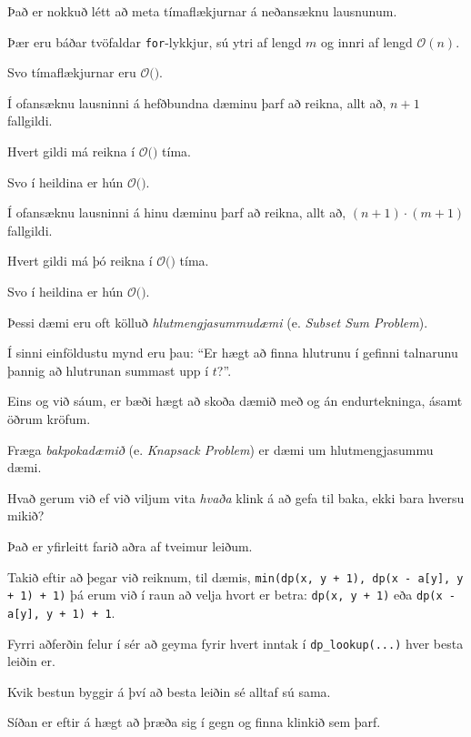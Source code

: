 {
}

{
	{
		\item<1-> Það er nokkuð létt að meta tímaflækjurnar á neðansæknu lausnunum.
		\item<2-> Þær eru báðar tvöfaldar \texttt{for}-lykkjur, sú ytri af lengd $m$ og innri af lengd $\mathcal{O}(n)$.
		\item<3-> Svo tímaflækjurnar eru $\mathcal{O}($\onslide<4->{$n \cdot m$}$)$.
	}
}

{
	{
		\item<1-> Í ofansæknu lausninni á hefðbundna dæminu þarf að reikna, allt að, $n + 1$ fallgildi.
		\item<2-> Hvert gildi má reikna í $\mathcal{O}($$)$ tíma.
		\item<4-> Svo í heildina er hún $\mathcal{O}($\onslide<5->{$n \cdot m$}$)$.
		\item<1->[] 
	}
}

{
	{
		\item<1-> Í ofansæknu lausninni á hinu dæminu þarf að reikna, allt að, $(n + 1) \cdot (m + 1)$ fallgildi.
		\item<2-> Hvert gildi má þó reikna í $\mathcal{O}($$)$ tíma.
		\item<4-> Svo í heildina er hún $\mathcal{O}($\onslide<5->{$n \cdot m$}$)$.
		\item<1->[] 
	}
}

{
	{
		\item<1-> Þessi dæmi eru oft kölluð \emph{hlutmengjasummudæmi} (e. \emph{Subset Sum Problem}).
		\item<2-> Í sinni einföldustu mynd eru þau: ``Er hægt að finna hlutrunu í gefinni talnarunu þannig að hlutrunan summast upp í $t$?''.
		\item<3-> Eins og við sáum, er bæði hægt að skoða dæmið með og án endurtekninga, ásamt öðrum kröfum.
		\item<4-> Fræga \emph{bakpokadæmið} (e. \emph{Knapsack Problem}) er dæmi um hlutmengjasummu dæmi.
	}
}

{
	{
		\item<1-> Hvað gerum við ef við viljum vita \emph{hvaða} klink á að gefa til baka, ekki bara hversu mikið?
		\item<2-> Það er yfirleitt farið aðra af tveimur leiðum.
		\item<3-> Takið eftir að þegar við reiknum, til dæmis, \texttt{min(dp(x, y + 1), dp(x - a[y], y + 1) + 1)}
					þá erum við í raun að velja hvort er betra: \texttt{dp(x, y + 1)} eða \texttt{dp(x - a[y], y + 1) + 1}.
		\item<4-> Fyrri aðferðin felur í sér að geyma fyrir hvert inntak í \texttt{dp\_lookup(...)} hver besta leiðin er.
		\item<5-> Kvik bestun byggir á því að besta leiðin sé alltaf sú sama.
		\item<6-> Síðan er eftir á hægt að þræða sig í gegn og finna klinkið sem þarf.
	}
}

